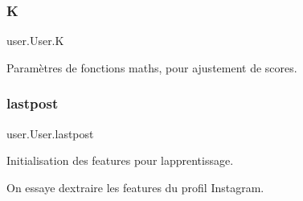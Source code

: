 \paragraph*{}\mbox{\label{classuser_1_1_user_a40a93b76c643c0eb076abc8ae0f15f31}} 
\subsubsection{\texorpdfstring{K}{K}}
{\footnotesize\ttfamily user.\+User.\+K}



Paramètres de fonctions maths, pour ajustement de scores. 

\paragraph*{}\mbox{\label{classuser_1_1_user_a31bd1f48a5a64a4319d8d93beca49706}} 
\subsubsection{\texorpdfstring{lastpost}{lastpost}}
{\footnotesize\ttfamily user.\+User.\+lastpost}



Initialisation des features pour l\textquotesingle{}apprentissage. 

On essaye d\textquotesingle{}extraire les features du profil Instagram.

\paragraph*{}

\paragraph*{}

